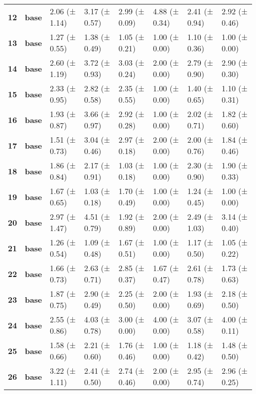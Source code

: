 \begin{longtable}{llllllll}
\cline{1-8}
\textbf{12} & \textbf{base} & 2.06 (± 1.14) & 3.17 (± 0.57) & 2.99 (± 0.09) & 4.88 (± 0.34) & 2.41 (± 0.94) & 2.92 (± 0.46) \\
\cline{1-8}
\textbf{13} & \textbf{base} & 1.27 (± 0.55) & 1.38 (± 0.49) & 1.05 (± 0.21) & 1.00 (± 0.00) & 1.10 (± 0.36) & 1.00 (± 0.00) \\
\cline{1-8}
\textbf{14} & \textbf{base} & 2.60 (± 1.19) & 3.72 (± 0.93) & 3.03 (± 0.24) & 2.00 (± 0.00) & 2.79 (± 0.90) & 2.90 (± 0.30) \\
\cline{1-8}
\textbf{15} & \textbf{base} & 2.33 (± 0.95) & 2.82 (± 0.58) & 2.35 (± 0.55) & 1.00 (± 0.00) & 1.40 (± 0.65) & 1.10 (± 0.31) \\
\cline{1-8}
\textbf{16} & \textbf{base} & 1.93 (± 0.87) & 3.66 (± 0.97) & 2.92 (± 0.28) & 1.00 (± 0.00) & 2.02 (± 0.71) & 1.82 (± 0.60) \\
\cline{1-8}
\textbf{17} & \textbf{base} & 1.51 (± 0.73) & 3.04 (± 0.46) & 2.97 (± 0.18) & 2.00 (± 0.00) & 2.00 (± 0.76) & 1.84 (± 0.46) \\
\cline{1-8}
\textbf{18} & \textbf{base} & 1.86 (± 0.84) & 2.17 (± 0.91) & 1.03 (± 0.18) & 1.00 (± 0.00) & 2.30 (± 0.90) & 1.90 (± 0.33) \\
\cline{1-8}
\textbf{19} & \textbf{base} & 1.67 (± 0.65) & 1.03 (± 0.18) & 1.70 (± 0.49) & 1.00 (± 0.00) & 1.24 (± 0.45) & 1.00 (± 0.00) \\
\cline{1-8}
\textbf{20} & \textbf{base} & 2.97 (± 1.47) & 4.51 (± 0.79) & 1.92 (± 0.89) & 2.00 (± 0.00) & 2.49 (± 1.03) & 3.14 (± 0.40) \\
\cline{1-8}
\textbf{21} & \textbf{base} & 1.26 (± 0.54) & 1.09 (± 0.48) & 1.67 (± 0.51) & 1.00 (± 0.00) & 1.17 (± 0.50) & 1.05 (± 0.22) \\
\cline{1-8}
\textbf{22} & \textbf{base} & 1.66 (± 0.73) & 2.63 (± 0.71) & 2.85 (± 0.37) & 1.67 (± 0.47) & 2.61 (± 0.78) & 1.73 (± 0.63) \\
\cline{1-8}
\textbf{23} & \textbf{base} & 1.87 (± 0.75) & 2.90 (± 0.49) & 2.25 (± 0.50) & 2.00 (± 0.00) & 1.93 (± 0.69) & 2.18 (± 0.50) \\
\cline{1-8}
\textbf{24} & \textbf{base} & 2.55 (± 0.86) & 4.03 (± 0.78) & 3.00 (± 0.00) & 4.00 (± 0.00) & 3.07 (± 0.58) & 4.00 (± 0.11) \\
\cline{1-8}
\textbf{25} & \textbf{base} & 1.58 (± 0.66) & 2.21 (± 0.60) & 1.76 (± 0.46) & 1.00 (± 0.00) & 1.18 (± 0.42) & 1.48 (± 0.50) \\
\cline{1-8}
\textbf{26} & \textbf{base} & 3.22 (± 1.11) & 2.41 (± 0.50) & 2.74 (± 0.46) & 2.00 (± 0.00) & 2.95 (± 0.74) & 2.96 (± 0.25) \\

\end{longtable}
